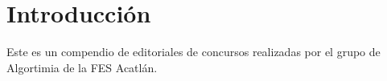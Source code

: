 \chapter{Introducción}

Este es un compendio de editoriales de concursos realizadas por el grupo de Algortimia de la FES Acatlán.
